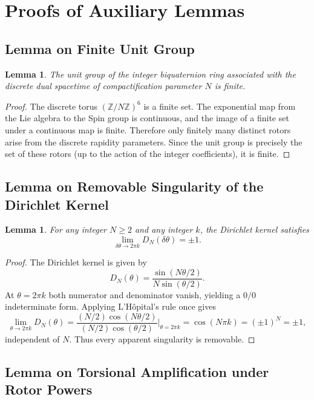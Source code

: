 \documentclass[dvipdfmx,a4paper]{article}
\newtheorem{lemma}[theorem]{Lemma}
\theoremstyle{definition}
\theoremstyle{remark}
\begin{document}
\section{Proofs of Auxiliary Lemmas}

\subsection{Lemma on Finite Unit Group}

\begin{lemma}
The unit group of the integer biquaternion ring associated with the discrete dual spacetime of compactification parameter \( N \) is finite.
\end{lemma}

\begin{proof}
The discrete torus \( (\mathbb{Z}/N\mathbb{Z})^6 \) is a finite set. The exponential map from the Lie algebra to the Spin group is continuous, and the image of a finite set under a continuous map is finite. Therefore only finitely many distinct rotors arise from the discrete rapidity parameters. Since the unit group is precisely the set of these rotors (up to the action of the integer coefficients), it is finite.
\end{proof}

\subsection{Lemma on Removable Singularity of the Dirichlet Kernel}

\begin{lemma}
For any integer \( N \geq 2 \) and any integer \( k \), the Dirichlet kernel satisfies
\[
\lim_{\delta\theta \to 2\pi k} D_N(\delta\theta) = \pm 1.
\]
\end{lemma}

\begin{proof}
The Dirichlet kernel is given by
\[
D_N(\theta) = \frac{\sin(N\theta/2)}{N\sin(\theta/2)}.
\]
At \( \theta = 2\pi k \) both numerator and denominator vanish, yielding a \( 0/0 \) indeterminate form. Applying L'Hôpital's rule once gives
\[
\lim_{\theta \to 2\pi k} D_N(\theta) = \frac{(N/2)\cos(N\theta/2)}{(N/2)\cos(\theta/2)} \Big|_{\theta=2\pi k} = \cos(N\pi k) = (\pm 1)^N = \pm 1,
\]
independent of \( N \). Thus every apparent singularity is removable.
\end{proof}

\subsection{Lemma on Torsional Amplification under Rotor Powers}
\end{document}
